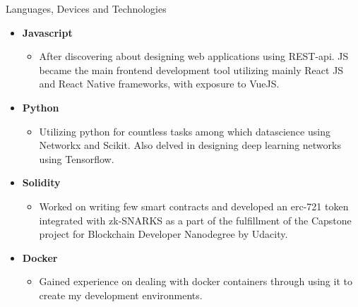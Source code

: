 \documentclass[]{mcdowellcv}
\begin{document}
	\begin{cvsection}{Languages, Devices and Technologies}
		\begin{cvsubsection}{}{}{}	
			\begin{itemize}
				\item \textbf{Javascript} 
				\begin{itemize}
					\item After discovering about designing web applications using REST-api. JS became the main frontend development tool utilizing mainly React JS and React Native frameworks, with exposure to VueJS.
				\end{itemize}
				\item \textbf{Python}
				\begin{itemize}
					\item Utilizing python for countless tasks among which datascience using Networkx and Scikit. Also delved in designing deep learning networks using Tensorflow. 
				\end{itemize}
				
				\item \textbf{Solidity}
				\begin{itemize}
					\item Worked on writing few smart contracts and developed an erc-721 token integrated with zk-SNARKS as a part of the fulfillment of the Capstone project for Blockchain Developer Nanodegree by Udacity.
				\end{itemize}
				\item \textbf{Docker}
				\begin{itemize}
					\item Gained experience on dealing with docker containers through using it to create my development environments. 
				\end{itemize}
			
			
			\newpage
			

\end{itemize}
\end{cvsubsection}
\end{cvsection}
\end{document}

